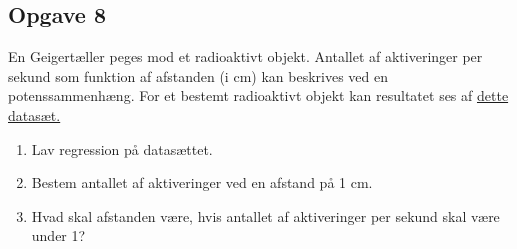 \subsection*{Opgave 8}

En Geigertæller peges mod et radioaktivt objekt. Antallet af aktiveringer per sekund som funktion af afstanden (i cm) kan beskrives ved en potenssammenhæng. For et bestemt radioaktivt objekt kan resultatet ses af \href{https://github.com/ChristianJLex/TeachingNotes/raw/master/2023-2024/Data%20og%20lign/Geiger.xlsx}{\color{blue!60} dette datasæt.}

\begin{enumerate}[label=\roman*)]
	\item Lav regression på datasættet.
	\item Bestem antallet af aktiveringer ved en afstand på 1 cm. 
	\item Hvad skal afstanden være, hvis antallet af aktiveringer per sekund skal være under 1?
\end{enumerate}
